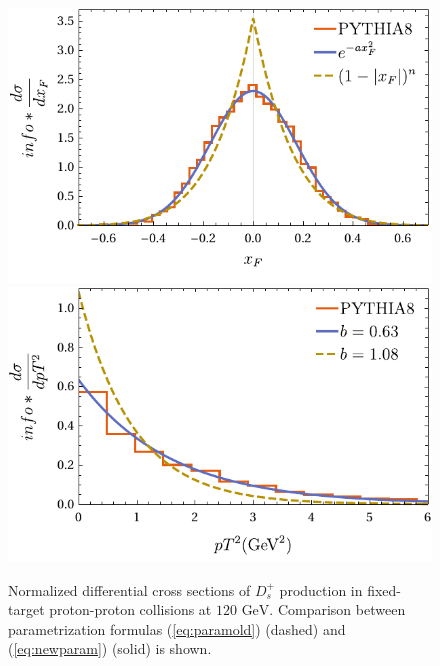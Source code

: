 \documentclass[aps,prd,twocolumn,superscriptaddress,amsmath,amssymb]{revtex4}
\newcommand{\lw}{\linewidth}
\begin{document}
\begin{figure}[h]
\includegraphics[width=0.9\lw]{plots/plot-fit431xf.pdf}
\includegraphics[width=0.9\lw]{plots/plot-fit431pt2.pdf}
\caption{Normalized differential cross sections of $D_s^+$ production in fixed-target proton-proton collisions at $120\text{ GeV}$. Comparison between parametrization formulas (\ref{eq:paramold}) (dashed) and (\ref{eq:newparam}) (solid) is shown.}
\label{fig:param}
\end{figure}
\end{document}
